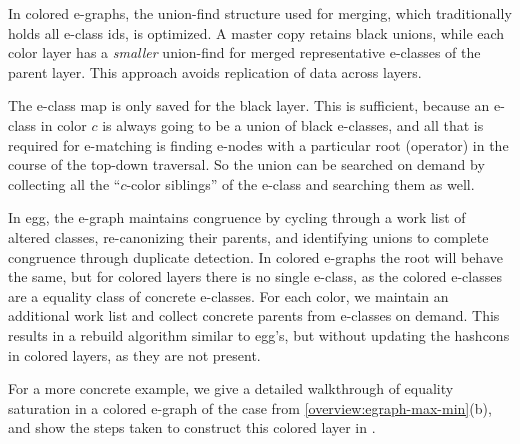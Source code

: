 In colored e-graphs, the union-find structure used for merging, which traditionally holds all e-class ids, is optimized. 
A master copy retains black unions, while each color layer has a \emph{smaller} union-find for merged representative e-classes of the parent layer. 
This approach avoids replication of data across layers.

The e-class map is only saved for the black layer.
This is sufficient, because an e-class in color $c$ is always going to be a union of black e-classes, and all that is required for e-matching is finding e-nodes with a particular root (operator) in the course of the top-down traversal.
So the union can be searched on demand by collecting all the ``$c$-color siblings'' of the e-class and searching them as well.

In egg, the e-graph maintains congruence by cycling through a work list of altered classes, re-canonizing their parents, and identifying unions to complete congruence through duplicate detection.
In colored e-graphs the root will behave the same, but for colored layers there is no single e-class, as the colored e-classes are a equality class of concrete e-classes.
For each color, we maintain an additional work list and collect concrete parents from e-classes on demand. 
This results in a rebuild algorithm similar to egg's, but without updating the hashcons in colored layers, as they are not present.

For a more concrete example, we give a detailed walkthrough of equality saturation in a colored e-graph of the \cred case from  \autoref{overview:egraph-max-min}(b), and show the steps taken
to construct this colored layer in .

